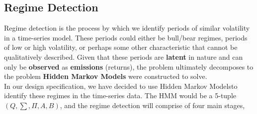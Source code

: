 \subsection{Regime Detection}

Regime detection is the process by which we identify periods of similar volatility in a time-series model. These periods could either be bull/bear regimes, periods of low or high volatility, or perhaps some other characteristic that cannot be qualitatively described. Given that these periods are \textbf{latent} in nature and can only be \textbf{observed} as \textbf{emissions} (returns), the problem ultimately decomposes to the problem \textbf{Hidden Markov Models} were constructed to solve. \\

In our design specification, we have decided to use Hidden Markov Models\footnotemark to identify these regimes in the time-series data. The HMM would be a 5-tuple $(Q, \sum, \Pi, A, B)$,  and the regime detection will comprise of four main stages, 

